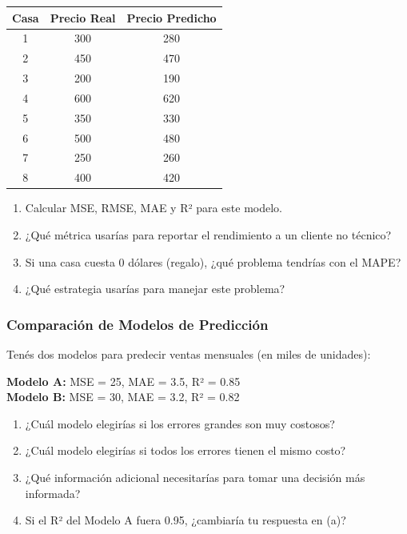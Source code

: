 \documentclass[12pt]{article}
\begin{document}
\begin{table}[H]
    \centering
    \begin{tabular}{|c|c|c|}
        \hline
        \textbf{Casa} & \textbf{Precio Real} & \textbf{Precio Predicho} \\
        \hline
        1 & 300 & 280 \\
        2 & 450 & 470 \\
        3 & 200 & 190 \\
        4 & 600 & 620 \\
        5 & 350 & 330 \\
        6 & 500 & 480 \\
        7 & 250 & 260 \\
        8 & 400 & 420 \\
        \hline
    \end{tabular}
\end{table}

\begin{enumerate}
    \item[a.] Calcular MSE, RMSE, MAE y R² para este modelo.
    \item[b.] ¿Qué métrica usarías para reportar el rendimiento a un cliente no técnico?
    \item[c.] Si una casa cuesta 0 dólares (regalo), ¿qué problema tendrías con el MAPE?
    \item[d.] ¿Qué estrategia usarías para manejar este problema?
\end{enumerate}

\subsubsection{Comparación de Modelos de Predicción}

Tenés dos modelos para predecir ventas mensuales (en miles de unidades):

\textbf{Modelo A:} MSE = 25, MAE = 3.5, R² = 0.85 \\
\textbf{Modelo B:} MSE = 30, MAE = 3.2, R² = 0.82

\begin{enumerate}
    \item[a.] ¿Cuál modelo elegirías si los errores grandes son muy costosos?
    \item[b.] ¿Cuál modelo elegirías si todos los errores tienen el mismo costo?
    \item[c.] ¿Qué información adicional necesitarías para tomar una decisión más informada?
    \item[d.] Si el R² del Modelo A fuera 0.95, ¿cambiaría tu respuesta en (a)?
\end{enumerate}
\end{document}
